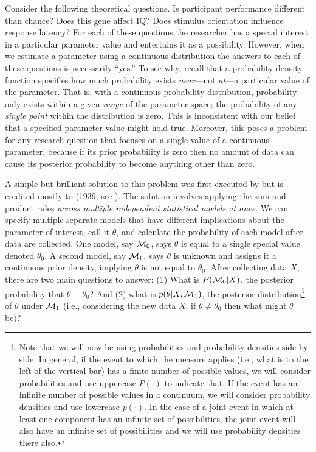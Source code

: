 \noindent Consider the following theoretical questions. Is participant performance different than chance? Does this gene affect IQ? Does stimulus orientation influence response latency? For each of these questions the researcher has a special interest in a particular parameter value and entertains it as a possibility. However, when we estimate a parameter using a continuous distribution the answers to each of these questions is necessarily ``yes.'' To see why, recall that a probability density function specifies how much probability exists \emph{near}---not \emph{at}---a particular value of the parameter. That is, with a continuous probability distribution, probability only exists within a given \textit{range} of the parameter space; the probability of any \textit{single point} within the distribution is zero. This is inconsistent with our belief that a specified parameter value might hold true. Moreover, this poses a problem for any research question that focuses on a single value of a continuous parameter, because if its prior probability is zero then no amount of data can cause its posterior probability to become anything other than zero.

A simple but brilliant solution to this problem was first executed by  but is credited mostly to \citeauthor{Jeffreys1939} (1939; see ).  The solution involves applying the sum and product rules \emph{across multiple independent statistical models at once}. We can specify multiple separate models that have different implications about the parameter of interest, call it $\theta$, and calculate the probability of each model after data are collected. One model, say ${\cal M}_0$, says $\theta$ is equal to a single special value denoted $\theta_0$. A second model, say ${\cal M}_1$, says $\theta$ is unknown and assigns it a continuous prior density, implying $\theta$ is not equal to $\theta_0$. After collecting data $X$, there are two main questions to answer: (1) What is $P({\cal M}_0|X)$, the posterior probability that $\theta=\theta_0$? And (2) what is  $p(\theta|X,{\cal M}_1)$, the posterior distribution\footnote{Note that we will now be using probabilities and probability densities side-by-side. In general, if the event to which the measure applies (i.e., what is to the left of the vertical bar) has a finite number of possible values, we will consider probabilities and use uppercase $P(\cdot)$ to indicate that. If the event has an infinite number of possible values in a continuum, we will consider probability densities and use lowercase $p(\cdot)$. In the case of a joint event in which at least one component has an infinite set of possibilities, the joint event will also have an infinite set of possibilities and we will use probability densities there also.}
of $\theta$ under ${\cal M}_1$ (i.e., considering the new data $X$, if $\theta\neq\theta_0$ then what might $\theta$ be)?

